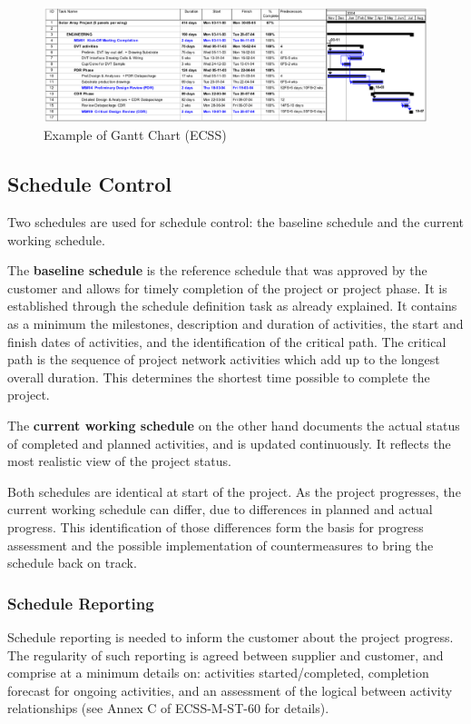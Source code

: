 \begin{figure}[h]
\centering\includegraphics[scale=0.3]{fig/example_of_gantt_chart}
\caption{Example of Gantt Chart (ECSS)}
\label{fig:Example of Gantt Chart}
\end{figure}

\subsection{Schedule Control}

Two schedules are used for schedule control: the baseline schedule and the current working schedule. 

The \textbf{baseline schedule} is the reference schedule that was approved by the customer and allows for timely completion of the project or project phase. It is established through the schedule definition task as already explained. It contains as a minimum the milestones, description and duration of activities, the start and finish dates of activities, and the identification of the critical path. The critical path is the sequence of project network activities which add up to the longest overall duration. This determines the shortest time possible to complete the project.

The \textbf{current working schedule} on the other hand documents the actual status of completed and planned activities, and is updated continuously. It reflects the most realistic view of the project status.

Both schedules are identical at start of the project. As the project progresses, the current working schedule can differ, due to differences in planned and actual progress. This identification of those differences form the basis for progress assessment and the possible implementation of countermeasures to bring the schedule back on track.

\subsubsection{Schedule Reporting}

Schedule reporting is needed to inform the customer about the project progress. The regularity of such reporting is agreed between supplier and customer, and comprise at a minimum details on: activities started/completed, completion forecast for ongoing activities, and an assessment of the logical between activity relationships (see Annex C of ECSS-M-ST-60 for details).

